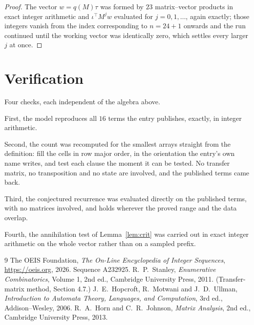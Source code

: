 \documentclass[11pt,a4paper]{article}
\theoremstyle{plain}
\theoremstyle{definition}
\begin{document}
\begin{proof}
The vector $w=q(M)\tau$ was formed by $23$ matrix--vector products in exact integer
arithmetic and $\iota^{\!\top}M^{j}w$ evaluated for $j=0,1,\dots$, again exactly; those
integers vanish from the index corresponding to $n=24+1$ onwards and the run continued
until the working vector was identically zero, which settles every larger $j$ at once.
\end{proof}

\section{Verification}

Four checks, each independent of the algebra above.

First, the model reproduces all $16$ terms the entry publishes, exactly, in integer
arithmetic.

Second, the count was recomputed for the smallest arrays straight from the definition: fill the
cells in row major order, in the orientation the entry's own name writes, and test each clause
the moment it can be tested. No transfer matrix, no transposition and no state are involved,
and the published terms came back.

Third, the conjectured recurrence was evaluated directly on the published terms, with no
matrices involved, and holds wherever the proved range and the data overlap.

Fourth, the annihilation test of Lemma~\ref{lem:crit} was carried out in exact integer
arithmetic on the whole vector rather than on a sampled prefix.

\begin{thebibliography}{9}
 The OEIS Foundation, \emph{The On-Line Encyclopedia of Integer
Sequences}, \url{https://oeis.org}, 2026. Sequence A232925.
 R.~P.~Stanley, \emph{Enumerative Combinatorics}, Volume 1, 2nd ed.,
Cambridge University Press, 2011. (Transfer-matrix method, Section 4.7.)
 J.~E.~Hopcroft, R.~Motwani and J.~D.~Ullman, \emph{Introduction to Automata
Theory, Languages, and Computation}, 3rd ed., Addison--Wesley, 2006.
 R.~A.~Horn and C.~R.~Johnson, \emph{Matrix Analysis}, 2nd ed., Cambridge
University Press, 2013.
\end{thebibliography}
\end{document}
